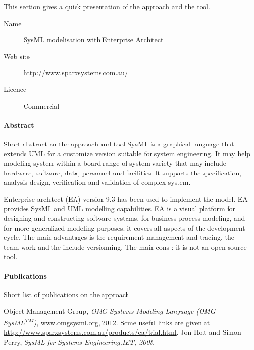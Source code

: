 This section gives a quick presentation of the approach and the tool.

\begin{description}
\item[Name] SysML modelisation with Enterprise Architect
\item[Web site] \url{http://www.sparxsystems.com.au/}
\item[Licence] Commercial
\end{description}

\paragraph{Abstract} Short abstract on the approach and tool 
SysML \cite{SysML} is a graphical language that extends UML for a customize
version suitable for system engineering. It may help modeling system within a board range of
system variety that may include hardware, software, data, personnel and facilities. It supports the
specification, analysis design, verification and validation of complex system.

Enterprise architect (EA) version 9.3 \cite{website} has been used to implement
the model. EA provides SysML and UML modelling capabilities.
EA is a visual platform for designing and constructing
software systems, for business process modeling, and for more generalized modeling purposes. it
covers all aspects of the development cycle. The main advantages is the requirement management
and tracing, the team work and the include versionning. The main cons : it is not an open source
tool.



\paragraph{Publications} Short list of publications on the approach 
\begingroup
\renewcommand{\chapter}[2]{}%
\renewcommand{\bibname}{}
\begin{thebibliography}{5}

Object Management Group,  {\it OMG Systems Modeling Language (OMG
SysML\textsuperscript{TM})}, \url{www.omgsysml.org}, 2012.
Some useful links are given at \url{http://www.sparxsystems.com.au/products/ea/trial.html}.
 Jon Holt and Simon Perry, \it{SysML for Systems
    Engineering},IET, 2008.
 
\end{thebibliography}
\endgroup



